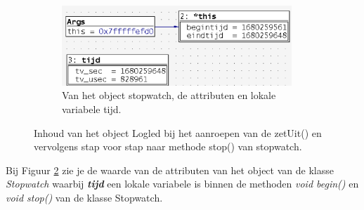 \begin{enumerate}[label=\alph*]
\begin{figure}[h!]
\begin{center}
\begin{subfigure}[b]{0.49\textwidth}
			\label{fig:logObjectA}
		\end{subfigure}
		\begin{subfigure}[b]{0.49\textwidth}
			\includegraphics[width=0.95\textwidth]{figuren/ddd_logled_p2b}
			\caption{Van het object stopwatch, de attributen en lokale variabele tijd.}
			\label{fig:logObjectB}
		\end{subfigure}
		\caption{Inhoud van het object Logled bij het aanroepen van de zetUit() en vervolgens stap voor stap naar methode stop() van stopwatch.}
		\label{fig:logledOjecten}   
	\end{center}
\end{figure}
Bij Figuur \ref{fig:logObjectB} zie je de waarde van de attributen van het object van de klasse \textit{Stopwatch} waarbij \textit{\textbf{tijd}} een lokale variabele is binnen de methoden \textit{void begin()} en \textit{void stop()} van de klasse Stopwatch.
\end{enumerate}



